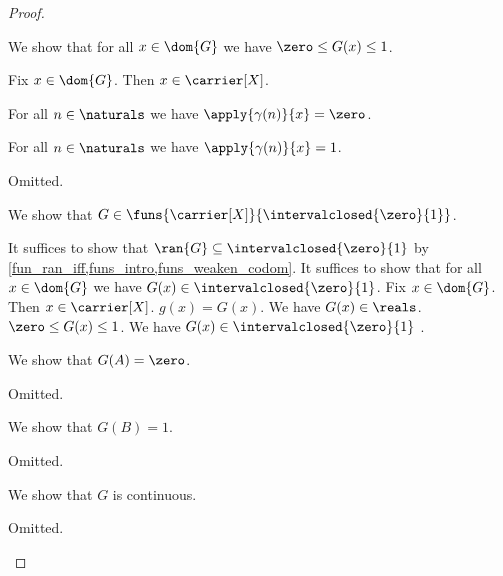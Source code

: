 \begin{proof}
\begin{subproof}
    \end{subproof}

    We show that for all $x \in \dom{G}$ we have $\zero \leq G(x) \leq 1$.
    \begin{subproof}
        Fix $x \in \dom{G}$.
        Then $x \in \carrier[X]$.
        \begin{byCase}
                For all $n \in \naturals$ we have $\apply{\gamma(n)}{x} = \zero$.


                \begin{byCase}
                        For all $n \in \naturals$ we have $\apply{\gamma(n)}{x} = 1$.

                        Omitted.
                \end{byCase}
        \end{byCase}
    \end{subproof}


    We show that $G \in \funs{\carrier[X]}{\intervalclosed{\zero}{1}}$.
    \begin{subproof}        
        It suffices to show that $\ran{G} \subseteq \intervalclosed{\zero}{1}$ by \cref{fun_ran_iff,funs_intro,funs_weaken_codom}.
        It suffices to show that for all $x \in \dom{G}$ we have $G(x) \in \intervalclosed{\zero}{1}$.
        Fix $x \in \dom{G}$.
        Then $x \in \carrier[X]$.
        $g(x) = G(x)$.
        We have $G(x) \in \reals$.
        $\zero \leq G(x) \leq 1$.
        We have $G(x) \in \intervalclosed{\zero}{1}$ .
    \end{subproof}

    We show that $G(A) = \zero$.
    \begin{subproof}
        Omitted.
    \end{subproof}

    We show that $G(B) = 1$.
    \begin{subproof}
        Omitted.
    \end{subproof}

    We show that $G$ is continuous.
    \begin{subproof}
        Omitted.
    \end{subproof}




\end{proof}
